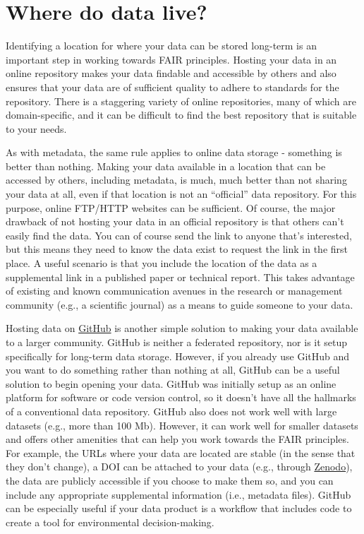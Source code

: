 \documentclass[
]{book}
\begin{document}
\section{Where do data live?}\label{datahome}

Identifying a location for where your data can be stored long-term is an important step in working towards FAIR principles. Hosting your data in an online repository makes your data findable and accessible by others and also ensures that your data are of sufficient quality to adhere to standards for the repository. There is a staggering variety of online repositories, many of which are domain-specific, and it can be difficult to find the best repository that is suitable to your needs.

As with metadata, the same rule applies to online data storage - something is better than nothing. Making your data available in a location that can be accessed by others, including metadata, is much, much better than not sharing your data at all, even if that location is not an ``official'' data repository. For this purpose, online FTP/HTTP websites can be sufficient. Of course, the major drawback of not hosting your data in an official repository is that others can't easily find the data. You can of course send the link to anyone that's interested, but this means they need to know the data exist to request the link in the first place. A useful scenario is that you include the location of the data as a supplemental link in a published paper or technical report. This takes advantage of existing and known communication avenues in the research or management community (e.g., a scientific journal) as a means to guide someone to your data.

Hosting data on \href{https://github.com/}{GitHub} is another simple solution to making your data available to a larger community. GitHub is neither a federated repository, nor is it setup specifically for long-term data storage. However, if you already use GitHub and you want to do something rather than nothing at all, GitHub can be a useful solution to begin opening your data. GitHub was initially setup as an online platform for software or code version control, so it doesn't have all the hallmarks of a conventional data repository. GitHub also does not work well with large datasets (e.g., more than 100 Mb). However, it can work well for smaller datasets and offers other amenities that can help you work towards the FAIR principles. For example, the URLs where your data are located are stable (in the sense that they don't change), a DOI can be attached to your data (e.g., through \href{https://zenodo.org/}{Zenodo}), the data are publicly accessible if you choose to make them so, and you can include any appropriate supplemental information (i.e., metadata files). GitHub can be especially useful if your data product is a workflow that includes code to create a tool for environmental decision-making.
\end{document}
